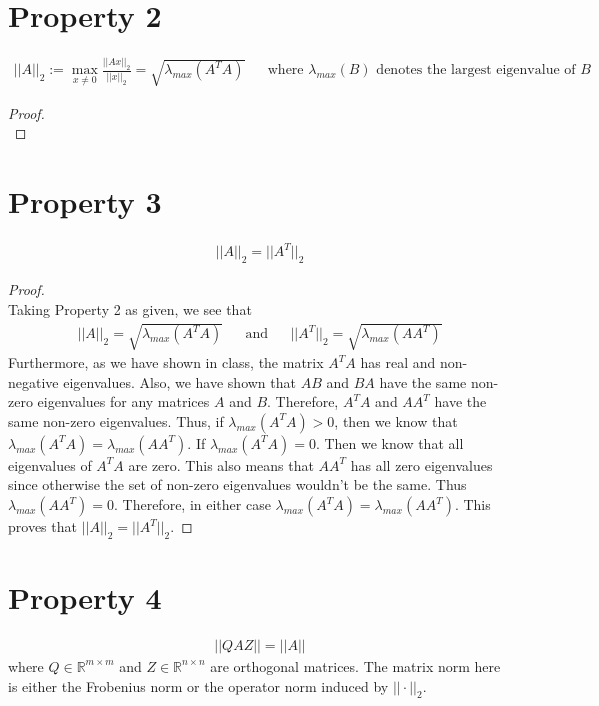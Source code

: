 \documentclass[10pt,a4paper]{article}
\theoremstyle{definition}
\theoremstyle{definition}
\numberwithin{equation}{section}
\begin{document}
\section*{Property 2}
\begin{align*}
||A||_2 := \max_{x \neq 0} \frac{||Ax||_2}{||x||_2} = \sqrt{\lambda_{max}(A^T A)} &&\text{where $\lambda_{max}(B)$ denotes the largest eigenvalue of $B$}
\end{align*}

\begin{proof}$ $
\\
\end{proof}

\section*{Property 3}
\begin{align*}
||A||_2 = ||A^T||_2
\end{align*}

\begin{proof}$ $
\\Taking Property 2 as given, we see that 
\begin{align*}
||A||_2 = \sqrt{\lambda_{max}(A^T A)} && \text{and} && ||A^T||_2 = \sqrt{\lambda_{max}(A A^T)}
\end{align*}
Furthermore, as we have shown in class, the matrix $A^TA$ has real and non-negative eigenvalues. Also, we have shown that $AB$ and $BA$ have the same non-zero eigenvalues for any matrices $A$ and $B$. Therefore, $A^TA$ and $AA^T$ have the same non-zero eigenvalues. Thus, if $\lambda_{max}(A^TA) > 0$, then we know that $\lambda_{max}(A^TA) = \lambda_{max}(AA^T)$. If $\lambda_{max}(A^TA) = 0$. Then we know that all eigenvalues of $A^TA$ are zero. This also means that $AA^T$ has all zero eigenvalues since otherwise the set of non-zero eigenvalues wouldn't be the same. Thus $\lambda_{max}(AA^T) = 0$. Therefore, in either case $\lambda_{max}(A^TA) = \lambda_{max}(AA^T)$. This proves that $||A||_2 = ||A^T||_2$. 
\end{proof}

\section*{Property 4}
\begin{align*}
||QAZ|| = ||A||
\end{align*}
where $Q \in \mathbb{R}^{m \times m}$ and $Z \in \mathbb{R}^{n \times n}$ are orthogonal matrices. The matrix norm here is either the Frobenius norm or the operator norm induced by $||\cdot||_2$. 
\end{document}
